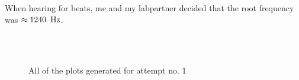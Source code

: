 \documentclass[%
 reprint,
 amsmath,amssymb,
 aps,
]{revtex4-1}
\begin{document}
    When hearing for beats, me and my labpartner decided that the root frequency was $\approx 1240\enspace\textup{Hz}$.
    \newline
    \begin{figure}[h!]
      \centering
       \\
       \\
      \caption{All of the plots generated for attempt no. 1}
      \label{fig:sound_exp1}
    \end{figure}
\end{document}
